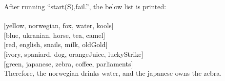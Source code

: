 \documentclass[12pt]{article}
\begin{document}
\noindent After running ``start(S),fail.'', the below list is printed:\\\\
$[$yellow, norwegian, fox,     water,  	       kools$]$\\
$[$blue,    ukranian,     horse, tea,               camel$]$\\
$[$red,     english,        snails,  milk,  	       oldGold$]$\\
$[$ivory,  spaniard,      dog,    orangeJuice, luckyStrike$]$\\
$[$green, japanese,    zebra,  coffee,          parliaments$]$\\

\noindent Therefore, the norwegian drinks water, and the japanese owns the zebra.
\end{document}
